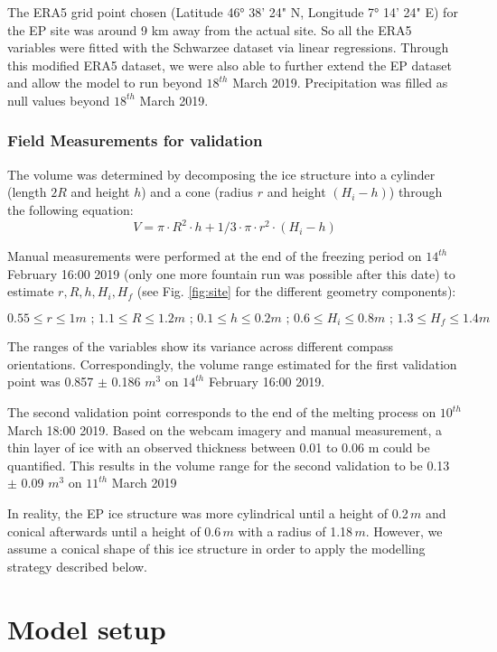 \documentclass[utf8]{frontiersSCNS} %
\begin{document}
The ERA5 grid point chosen (Latitude 46° 38' 24" N, Longitude 7° 14' 24" E) for the EP site was around 9 km
away from the actual site.  So all the ERA5 variables were fitted with the Schwarzee dataset via linear regressions.
Through this modified ERA5 dataset, we were also able to further extend the EP dataset and allow the model to
run beyond $18^{th}$ March 2019. Precipitation was filled as null values beyond $18^{th}$ March 2019.


\subsubsection{Field Measurements for validation} \label{section:validation} 
The volume was determined by decomposing the ice structure into a cylinder (length $2R$ and height $h$) and a
cone (radius $r$ and height $(H_i-h)$) through the following equation: 
\begin{equation} V = \pi \cdot R^2 \cdot h + 1/3 \cdot \pi \cdot r^2 \cdot (H_i-h) \end{equation}

Manual measurements were performed at the end of the freezing period on $14^{th}$ February 16:00 2019 (only one more
fountain run was possible after this date) to estimate $r, R, h, H_i, H_f$ (see Fig. \ref{fig:site} for the different
geometry components):

$$ 0.55\leq r\leq 1 m\textit{ ; }1.1\leq R\leq 1.2 m\textit{ ; }0.1\leq h\leq 0.2 m\textit{ ; }0.6\leq
H_i\leq 0.8 m\textit{ ; }1.3\leq H_f\leq 1.4 m  $$

The ranges of the variables show its variance across different compass orientations.  Correspondingly, the volume range
estimated for the first validation point was 0.857 $\pm$ 0.186 $m^{3}$ on $14^{th}$ February 16:00 2019.

The second validation point corresponds to the end of the melting process on $10^{th}$ March 18:00 2019.  Based on the
webcam imagery and manual measurement, a thin layer of ice with an observed thickness between 0.01 to 0.06 m could be
quantified. This results in the volume range for the second validation to be 0.13 $\pm$ 0.09 $m^{3}$ on $11^{th}$ March
2019 

In reality, the EP ice structure was more cylindrical until a height of 0.2\,$m$ and conical afterwards until a
height of 0.6\,$m$ with a radius of 1.18\,$m$. However, we assume a conical shape of this ice structure in order to
apply the modelling strategy described below.

\section{Model setup}
\end{document}
